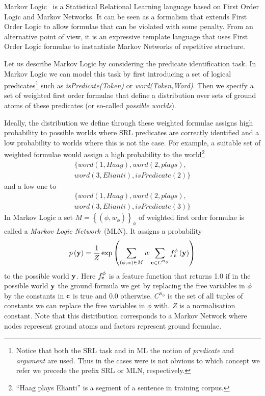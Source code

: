 

Markov Logic~\citep[ML,][]{richardson05markov} is a Statistical Relational Learning language based on First Order Logic and Markov Networks. It can be seen as a formalism that extends First Order Logic to allow formulae that can be violated
with some penalty. From an alternative point of view, it is an expressive
template language that uses First Order Logic formulae to instantiate
Markov Networks of repetitive structure. 

Let us describe Markov Logic by considering the predicate identification task. In Markov Logic we can model this task by first introducing a set of logical predicates\footnote{Notice that both the SRL task and in ML the notion of \emph{predicate} and \emph{argument} are used. Thus in the cases were is not obvious to which concept we refer we precede the prefix SRL or MLN, respectively.} such as \emph{isPredicate(Token)} or \emph{word(Token,Word)}. Then we specify a set of weighted first order formulae that define a distribution over sets of ground atoms of these predicates (or so-called \emph{possible worlds}). 

Ideally, the distribution we define through these weighted formulae assigns high probability to possible worlds where SRL predicates are correctly identified and a low probability to worlds where this is not the case. For example, a suitable set of weighted formulae would assign a high probability to the world\footnote{``Haag plays Elianti'' is a segment of a sentence in training corpus.}
\begin{eqnarray*}
 &\{ word\left(1,Haag\right),word(2,plays),\\
 & word(3,Elianti),isPredicate(2) \}& \end{eqnarray*}
and a low one to
\begin{eqnarray*}
& \{ word\left(1,Haag\right),word(2,plays),\\
 & word(3,Elianti),isPredicate(3) \} &\end{eqnarray*}
In Markov Logic a set $M=\left\{ \left(\phi,w_{\phi}\right)\right\} _{\phi}$ of weighted first order formulae is called a \emph{Markov Logic Network}~(MLN). It assigns a probability
\begin{equation}
p\left(\mathbf{y}\right)=\frac{1}{Z}\exp\left(
\sum_{\left(\phi,w\right)\in M} w
\sum_{\mathbf{c}\in C^{n_{\phi}}}f_{\mathbf{c}}^{\phi}\left(\mathbf{y}\right)
\right)
\label{eq:prob}
\end{equation}
to the possible world $\mathbf{y}$. Here $f_{\mathbf{c}}^{\phi}$ is a feature
function that returns 1.0 if in the possible world $\mathbf{y}$ the ground
formula we get by replacing the free variables in $\phi$ by the constants
in $\mathbf{c}$ is true and 0.0 otherwise. $C^{n_{\phi}}$ is the set
of all tuples of constants we can replace the free variables in $\phi$
with. $Z$ is a normalisation constant. Note that this distribution corresponds to a Markov Network where nodes represent ground atoms and factors represent ground formulae.

